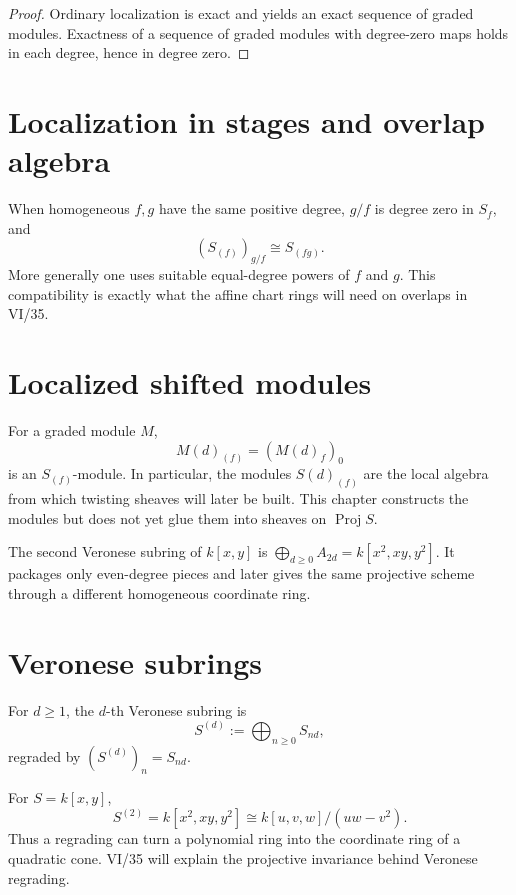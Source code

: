 \begin{proof}
Ordinary localization is exact and yields an exact sequence of graded modules. Exactness of a sequence of graded modules with degree-zero maps holds in each degree, hence in degree zero.
\end{proof}

\section{Localization in stages and overlap algebra}
When homogeneous \(f,g\) have the same positive degree, \(g/f\) is degree zero in \(S_f\), and
\[
(S_{(f)})_{g/f}\cong S_{(fg)}.
\]
More generally one uses suitable equal-degree powers of \(f\) and \(g\). This compatibility is exactly what the affine chart rings will need on overlaps in VI/35.

\section{Localized shifted modules}
For a graded module \(M\),
\[
M(d)_{(f)}=(M(d)_f)_0
\]
is an \(S_{(f)}\)-module. In particular, the modules \(S(d)_{(f)}\) are the local algebra from which twisting sheaves will later be built. This chapter constructs the modules but does not yet glue them into sheaves on \(\operatorname{Proj}S\).

\begin{example}\label{ex:vi34-expand-03}
The second Veronese subring of $k[x,y]$ is $\bigoplus_{d\ge0}A_{2d}=k[x^2,xy,y^2]$.  It packages only even-degree pieces and later gives the same projective scheme through a different homogeneous coordinate ring.
\end{example}
\section{Veronese subrings}
\begin{definition}
For \(d\ge1\), the \(d\)-th Veronese subring is
\[
S^{(d)}:=\bigoplus_{n\ge0}S_{nd},
\]
regraded by \((S^{(d)})_n=S_{nd}\).
\end{definition}

For \(S=k[x,y]\),
\[
S^{(2)}=k[x^2,xy,y^2]\cong k[u,v,w]/(uw-v^2).
\]
Thus a regrading can turn a polynomial ring into the coordinate ring of a quadratic cone. VI/35 will explain the projective invariance behind Veronese regrading.

